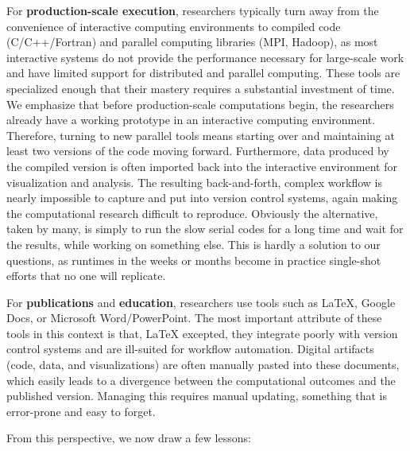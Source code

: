 \documentclass[ChapterTOCs,krantz2]{krantz} %
\begin{document}
For \textbf{production-scale execution}, researchers typically turn away from
the convenience of interactive computing environments to compiled code
(C/C++/Fortran) and parallel computing libraries (MPI, Hadoop), as most
interactive systems do not provide the performance necessary for large-scale
work and have limited support for distributed and parallel computing.  These
tools are specialized enough that their mastery requires a substantial
investment of time. We emphasize that before production-scale computations
begin, the researchers already have a working prototype in an interactive
computing environment. Therefore, turning to new parallel tools means starting
over and maintaining at least two versions of the code moving forward.
Furthermore, data produced by the compiled version is often imported back into
the interactive environment for visualization and analysis. The resulting
back-and-forth, complex workflow is nearly impossible to capture and put into
version control systems, again making the computational research difficult to
reproduce.  Obviously the alternative, taken by many, is simply to run the slow
serial codes for a long time and wait for the results, while working on
something else.  This is hardly a solution to our questions, as runtimes in the
weeks or months become in practice single-shot efforts that no one will
replicate.

For \textbf{publications} and \textbf{education}, researchers use tools such as
\LaTeX, Google Docs, or Microsoft Word/PowerPoint.  The most important attribute
of these tools in this context is that, \LaTeX{} excepted, they integrate
poorly with version control systems and are ill-suited for workflow automation.
Digital artifacts (code, data, and visualizations) are often manually pasted
into these documents, which easily leads to a divergence between the
computational outcomes and the published version.  Managing this requires
manual updating, something that is error-prone and easy to forget.

From this perspective, we now draw a few lessons:
\end{document}
